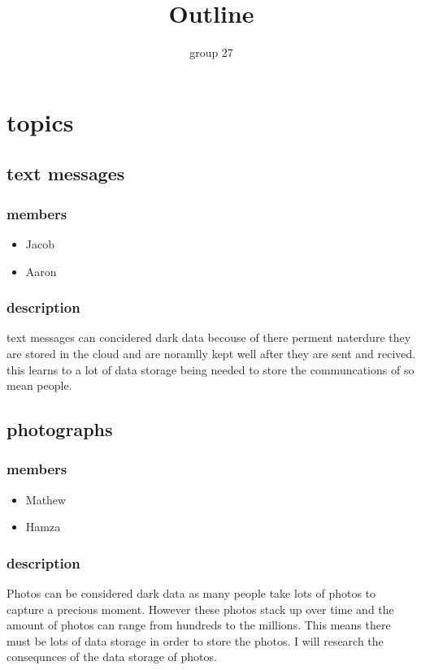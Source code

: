 \documentclass{article}
\begin{document}
\title{Outline}
\author{group 27}

\maketitle
\newpage


\section{topics}
\subsection{text messages} 
\subsubsection{members}
\begin{itemize}
    \item Jacob
    \item Aaron
\end{itemize}
\subsubsection{description}
 text messages can concidered dark data becouse of there perment naterdure they are stored in the cloud and 
 are noramlly kept well after they are sent and recived. this learns to a lot of data storage being needed to
 store the communcations of so mean people.

\subsection{photographs}
\subsubsection{members}
\begin{itemize}
    \item Mathew
    \item Hamza
\end{itemize}
\subsubsection{description}
Photos can be considered dark data as many people take lots of photos to capture a precious moment. However these photos stack up over time and the amount of photos can range from hundreds to the millions. This means there must be lots of data storage in order to store the photos.
I will research the consequnces of the data storage of photos.
\end{document}
